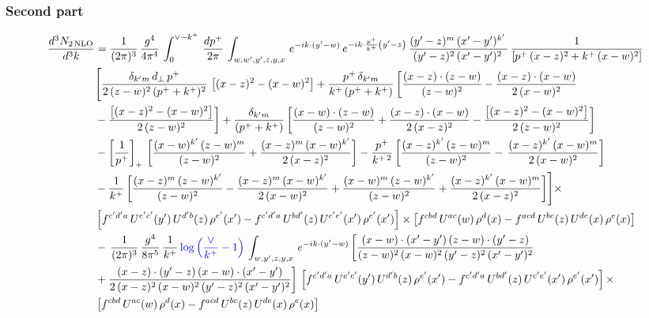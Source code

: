 \documentclass[9pt]{article}
\numberwithin{equation}{section}
\begin{document}
\subsubsection{Second part}
\begin{align}
 \frac{d^{3}N_{2\,\rm NLO}}{d^{3}k} & = \frac{1}{(2\pi)^{3}}\,\frac{g^{4}}{4\pi^{4}}\,\int_{0}^{\vee-k^{+}}\, \frac{dp^{+}}{2\pi}\,\int_{w,w',y',z,y,x}\, e^{-ik\cdot (y'-w)}\,e^{-ik\cdot \frac{p^{+}}{k^{+}}\left(y'-z\right)}\, \frac{(y'-z)^{m}\,(x'-y')^{k'}\,}{(y'-z)^{2}\,(x'-y')^{2}\,}\, \frac{1}{\left[p^{+}\,(x-z)^{2}+k^{+}\,(x-w)^{2}\right]}\notag \\ & \Bigg[\frac{\delta_{k'm}\,d_{\perp}\,p^{+}}{2\,(z-w)^{2}\,(p^{+}+k^{+})^{2}}\, \left[(x-z)^{2}-(x-w)^{2}\right]+\frac{p^{+}\,\delta_{k'm}}{k^{+}\,(p^{+}+k^{+})}\,\bigg[\frac{(x-z)\cdot (z-w)}{(z-w)^{2}} -\frac{(x-z)\cdot (x-w)}{2\,(x-w)^{2}}\notag \\ & -\frac{\left[(x-z)^{2}-(x-w)^{2}\right]}{2\,(z-w)^{2}}\bigg] +\frac{\delta_{k'm}}{(p^{+}+k^{+})}\,\bigg[\frac{(x-w)\cdot (z-w)}{(z-w)^{2}}+\frac{(x-z)\cdot (x-w)}{2\,(x-z)^{2}} -\frac{\left[(x-z)^{2}-(x-w)^{2}\right]}{2\,(z-w)^{2}}\bigg]\notag \\ & -\left[\frac{1}{p^{+}}\right]_{+}\,\bigg[\frac{(x-w)^{k'}\,(z-w)^{m}}{(z-w)^{2}}+\frac{(x-z)^{m}\,(x-w)^{k'}}{2\,(x-z)^{2}}\bigg]-\frac{p^{+}}{k^{+\,2}}\,\bigg[\frac{(x-z)^{k'}\,(z-w)^{m}}{(z-w)^{2}} -\,\frac{(x-z)^{k'}\,(x-w)^{m}}{2\,(x-w)^{2}}\bigg]\notag \\ & -\frac{1}{k^{+}}\,\bigg[\frac{(x-z)^{m}\,(z-w)^{k'}}{(z-w)^{2}}-\frac{(x-z)^{m}\,(x-w)^{k'}}{2\,(x-w)^{2}}+\frac{(x-w)^{m}\,(z-w)^{k'}}{(z-w)^{2}} +\frac{(x-z)^{k'}\,(x-w)^{m}}{2\,(x-z)^{2}}\bigg]\Bigg]\times\,\notag \\ & \left[f^{c'd'a}\,U^{e'c'}(y')\,U^{d'b}(z)\,\rho^{e'}(x')-f^{c'd'a}\, 
    U^{bd'}(z)\,U^{c'e'}(x')\,\rho^{e'}(x')\right]\times \left[f^{cbd}\,U^{ac}(w)\,\rho^{d}(x) -f^{acd}\,U^{bc}(z)\,U^{de}(x)\,\rho^{e}(x)\right]\notag \\ &  -\, \frac{1}{(2\pi)^{3}}\,\frac{g^{4}}{8\pi^{5}}\,\frac{1}{k^{+}}\,{\color{blue}\log{\left(\frac{\vee}{k^{+}}-1\right)}}\,\int_{w,y',z,y,x}\, e^{-ik\cdot (y'-w)}\,\bigg[\frac{(x-w)\cdot (x'-y')\,(z-w)\cdot (y'-z)}{(z-w)^{2}\,(x-w)^{2}\,(y'-z)^{2}\,(x'-y')^{2}}\notag \\ & +\frac{(x-z)\cdot (y'-z)\,(x-w)\cdot (x'-y')}{2\,(x-z)^{2}\,(x-w)^{2}\,(y'-z)^{2}\,(x'-y')^{2}}\bigg]\, \left[f^{c'd'a}\,U^{e'c'}(y')\,U^{d'b}(z)\,\rho^{e'}(x')-f^{c'd'a}\, 
    U^{bd'}(z)\,U^{c'e'}(x')\,\rho^{e'}(x')\right]\times\notag \\ &  \left[f^{cbd}\,U^{ac}(w)\,\rho^{d}(x) -f^{acd}\,U^{bc}(z)\,U^{de}(x)\,\rho^{e}(x)\right] 
\end{align}
\end{document}
